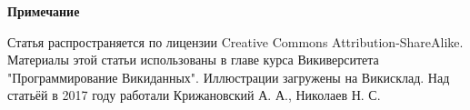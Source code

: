 
\textbf{Примечание}

Статья распространяется по лицензии Creative Commons Attribution-ShareAlike. Материалы этой статьи использованы в главе курса Викиверситета "Программирование Викиданных"\cite{WDBusinessEnterprise}. Иллюстрации загружены на Викисклад. Над статьёй в 2017 году работали Крижановский А. А., Николаев Н. С. 